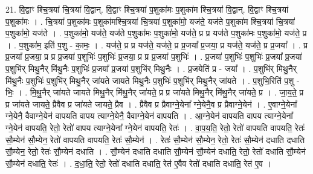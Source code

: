 \documentclass[17pt]{extarticle}
\begin{document}
21. वि॒द्वाꣳ श्चि॒त्रया॑ चि॒त्रया॑ वि॒द्वान्. वि॒द्वाꣳ श्चि॒त्रया॑ प॒शुका॑मः प॒शुका॑म श्चि॒त्रया॑ वि॒द्वान्. वि॒द्वाꣳ श्चि॒त्रया॑ प॒शुका॑मः । . चि॒त्रया॑ प॒शुका॑मः प॒शुका॑मश्चि॒त्रया॑ चि॒त्रया॑ प॒शुका॑मो॒ यज॑ते॒ यज॑ते प॒शुका॑म श्चि॒त्रया॑ चि॒त्रया॑ प॒शुका॑मो॒ यज॑ते । . प॒शुका॑मो॒ यज॑ते॒ यज॑ते प॒शुका॑मः प॒शुका॑मो॒ यज॑ते॒ प्र प्र यज॑ते प॒शुका॑मः प॒शुका॑मो॒ यज॑ते॒ प्र । . प॒शुका॑म॒ इति॑ प॒शु - का॒मः॒ । . यज॑ते॒ प्र प्र यज॑ते॒ यज॑ते॒ प्र प्र॒जया᳚ प्र॒जया॒ प्र यज॑ते॒ यज॑ते॒ प्र प्र॒जया᳚ । . प्र प्र॒जया᳚ प्र॒जया॒ प्र प्र प्र॒जया॑ प॒शुभिः॑ प॒शुभिः॑ प्र॒जया॒ प्र प्र प्र॒जया॑ प॒शुभिः॑ । . प्र॒जया॑ प॒शुभिः॑ प॒शुभिः॑ प्र॒जया᳚ प्र॒जया॑ प॒शुभि॑र् मिथु॒नैर् मि॑थु॒नैः प॒शुभिः॑ प्र॒जया᳚ प्र॒जया॑ प॒शुभि॑र् मिथु॒नैः । . प्र॒जयेति॑ प्र - जया᳚ । . प॒शुभि॑र् मिथु॒नैर् मि॑थु॒नैः प॒शुभिः॑ प॒शुभि॑र् मिथु॒नैर् जा॑यते जायते मिथु॒नैः प॒शुभिः॑ प॒शुभि॑र् मिथु॒नैर् जा॑यते । . प॒शुभि॒रिति॑ प॒शु - भिः॒ । . मि॒थु॒नैर् जा॑यते जायते मिथु॒नैर् मि॑थु॒नैर् जा॑यते॒ प्र प्र जा॑यते मिथु॒नैर् मि॑थु॒नैर् जा॑यते॒ प्र । . जा॒य॒ते॒ प्र प्र जा॑यते जायते॒ प्रैवैव प्र जा॑यते जायते॒ प्रैव । . प्रैवैव प्र प्रैवाग्ने॒येना᳚ ग्ने॒येनै॒व प्र प्रैवाग्ने॒येन॑ । . ए॒वाग्ने॒येना᳚ ग्ने॒येनै॒ वैवाग्ने॒येन॑ वापयति वापय त्याग्ने॒येनै॒ वैवाग्ने॒येन॑ वापयति । . आ॒ग्ने॒येन॑ वापयति वापय त्याग्ने॒येना᳚ ग्ने॒येन॑ वापयति॒ रेतो॒ रेतो॑ वापय त्याग्ने॒येना᳚ ग्ने॒येन॑ वापयति॒ रेतः॑ । . वा॒प॒य॒ति॒ रेतो॒ रेतो॑ वापयति वापयति॒ रेतः॑ सौ॒म्येन॑ सौ॒म्येन॒ रेतो॑ वापयति वापयति॒ रेतः॑ सौ॒म्येन॑ । . रेतः॑ सौ॒म्येन॑ सौ॒म्येन॒ रेतो॒ रेतः॑ सौ॒म्येन॑ दधाति दधाति सौ॒म्येन॒ रेतो॒ रेतः॑ सौ॒म्येन॑ दधाति । . सौ॒म्येन॑ दधाति दधाति सौ॒म्येन॑ सौ॒म्येन॑ दधाति॒ रेतो॒ रेतो॑ दधाति सौ॒म्येन॑ सौ॒म्येन॑ दधाति॒ रेतः॑ । . द॒धा॒ति॒ रेतो॒ रेतो॑ दधाति दधाति॒ रेत॑ ए॒वैव रेतो॑ दधाति दधाति॒ रेत॑ ए॒व । \newline
\end{document}
